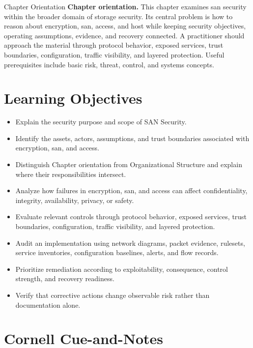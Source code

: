 \documentclass[11pt,letterpaper]{article}
\title{\CornellDocumentTitle}
\author{}
\date{}
\begin{document}
\maketitle
\begin{CornellOverviewBox}{Chapter Orientation}
\textbf{Chapter orientation.} This chapter examines san security within the broader domain of storage security. Its central problem is how to reason about encryption, san, access, and host while keeping security objectives, operating assumptions, evidence, and recovery connected. A practitioner should approach the material through protocol behavior, exposed services, trust boundaries, configuration, traffic visibility, and layered protection. Useful prerequisites include basic risk, threat, control, and systems concepts.
\end{CornellOverviewBox}
\section*{Learning Objectives}
\begin{itemize}
\item Explain the security purpose and scope of SAN Security.
\item Identify the assets, actors, assumptions, and trust boundaries associated with encryption, san, and access.
\item Distinguish Chapter orientation from Organizational Structure and explain where their responsibilities intersect.
\item Analyze how failures in encryption, san, and access can affect confidentiality, integrity, availability, privacy, or safety.
\item Evaluate relevant controls through protocol behavior, exposed services, trust boundaries, configuration, traffic visibility, and layered protection.
\item Audit an implementation using network diagrams, packet evidence, rulesets, service inventories, configuration baselines, alerts, and flow records.
\item Prioritize remediation according to exploitability, consequence, control strength, and recovery readiness.
\item Verify that corrective actions change observable risk rather than documentation alone.
\end{itemize}
\section*{Cornell Cue-and-Notes}
\end{document}
